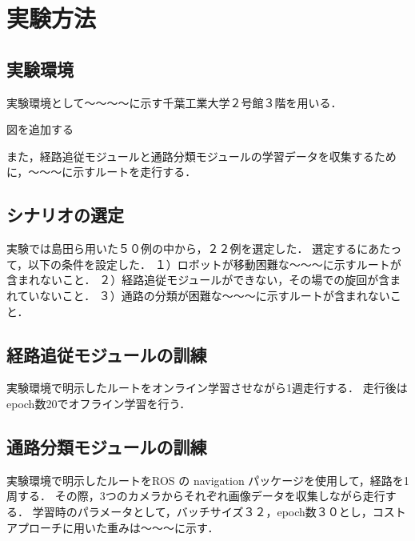 \section{実験方法}
\subsection{実験環境}
実験環境として～～～～に示す千葉工業大学２号館３階を用いる．

図を追加する

また，経路追従モジュールと通路分類モジュールの学習データを収集するために，～～～に示すルートを走行する．

\subsection{シナリオの選定}
実験では島田ら用いた５０例の中から，２２例を選定した．
選定するにあたって，以下の条件を設定した．
１）ロボットが移動困難な～～～に示すルートが含まれないこと．
２）経路追従モジュールができない，その場での旋回が含まれていないこと．
３）通路の分類が困難な～～～に示すルートが含まれないこと．

\subsection{経路追従モジュールの訓練}
実験環境で明示したルートをオンライン学習させながら1週走行する．
走行後はepoch数20でオフライン学習を行う．

\subsection{通路分類モジュールの訓練}
実験環境で明示したルートをROS の navigation パッケージを使用して，経路を1周する．
その際，3つのカメラからそれぞれ画像データを収集しながら走行する．
学習時のパラメータとして，バッチサイズ３２，epoch数３０とし，コストアプローチに用いた重みは～～～に示す．